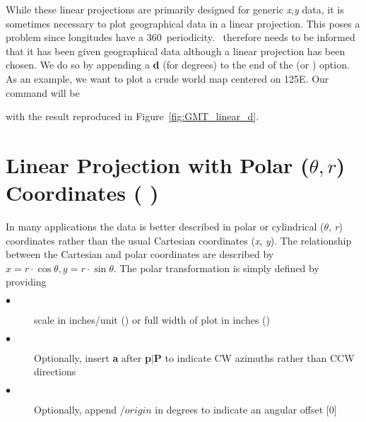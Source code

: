 While these linear projections are primarily designed for generic
{\it x},{\it y} data, it is sometimes necessary to plot geographical
data in a linear projection.  This poses a problem since longitudes
have a 360\DS\ periodicity.  \GMT\ therefore needs to be informed
that it has been given geographical data although a linear projection
has been chosen.  We do so by appending a {\bf d} (for degrees) to
the end of the  (or ) option.  As an example, we
want to plot a crude world map centered on 125\DS E.  Our command will be 

 

\noindent
with the result reproduced in Figure~\ref{fig:GMT_linear_d}.


\section{Linear Projection with Polar ($\theta, r$)
Coordinates ( )}


In many applications the data is better described in polar or
cylindrical ({\it $\theta$}, {\it r}) coordinates rather than
the usual Cartesian coordinates ({\it x}, {\it y}).  The
relationship between the Cartesian and polar coordinates are
described by $x = r \cdot \cos{\theta}, y = r \cdot \sin{\theta}$.
The polar transformation is simply defined by providing \\

\begin{description}

\item[$\bullet$] scale in inches/unit () or full width of plot in inches ()
\item[$\bullet$] Optionally, insert {\bf a} after {\bf p$|$P} to indicate CW azimuths rather than CCW directions
\item[$\bullet$] Optionally, append /$origin$ in degrees to indicate an angular offset [0]

\end{description}

